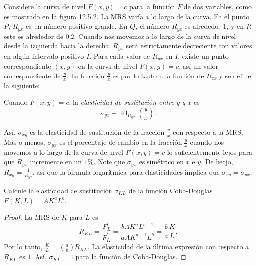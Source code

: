 \begin{frame}[t]
Considere la curva de nivel $F\left(x,y\right)=c$ para la función $F$ de dos variables, como es mostrado en la figura 12.5.2. La \textsc{MRS} varía a lo largo de la curva. En el punto $P$, $R_{yx}$ es un número positivo grande. En $Q$, el número $R_{yx}$ es alrededor $1$, y en $R$ este es alrededor de $0.2$. Cuando nos movemos a lo largo de la curva de nivel desde la izquierda hacia la derecha, $R_{yx}$ será estrictamente decreciente con valores en algún intervalo positivo $I$. Para cada valor de $R_{yx}$ en $I$, existe un punto correspondiente $\left(x,y\right)$ en la curva de nivel $F\left(x,y\right)=c$, así un valor correspondiente de $\frac{y}{x}$. La fracción $\frac{y}{x}$ es por lo tanto una función de $R_{zx}$ y se define la siguiente:

\begin{definition}
Cuando $F\left(x,y\right)=c$, la \emph{elasticidad de sustitución entre} $y$ \emph{y} $x$ es \[ \sigma_{yx}=\operatorname{El}_{R_{yx}}\left(\frac{y}{x}\right). \]
\end{definition}

Así, $\sigma_{xy}$ es la elasticidad de sustitución de la fracción $\frac{y}{x}$ con respecto a la \textsc{MRS}. Más o menos, $\sigma_{yx}$ es el porcentaje de cambio en la fracción $\frac{y}{x}$ cuando nos movemos a lo largo de la curva de nivel $F\left(x,y\right)=c$ lo suficientemente lejos para que $R_{yx}$ incremente en un $1\%$. Note que $\sigma_{yx}$ es simétrico en $x$ e $y$. De hecjo, $R_{xy}=\frac{1}{R_{yx}}$, así que la fórmula logarítmica para elasticidades implica que $\sigma_{xy}=\sigma_{yx}$.
\end{frame}

\begin{frame}[t]

\begin{example}
Calcule la elasticidad de sustitución $\sigma_{KL}$ de la función Cobb-Douglas $F\left(K,L\right)=AK^{a}L^{b}$.
\end{example}

\begin{proof}
La \textsc{MRS} de $K$ para $L$ es \[ R_{KL}=\frac{F^{\prime}_{L}}{F^{\prime}_{K}}=\frac{bAK^{a}L^{b-1}}{aAK^{a-1}L^{b}}=\frac{b}{a}\frac{K}{L}. \] Por lo tanto, $\frac{K}{L}=\left(\frac{a}{b}\right)R_{KL}$. La elasticidad de la última expresión con respecto a $R_{KL}$ es $1$. Así, $\sigma_{KL}=1$ para la función de Cobb-Douglas.
\end{proof}

\end{frame}

